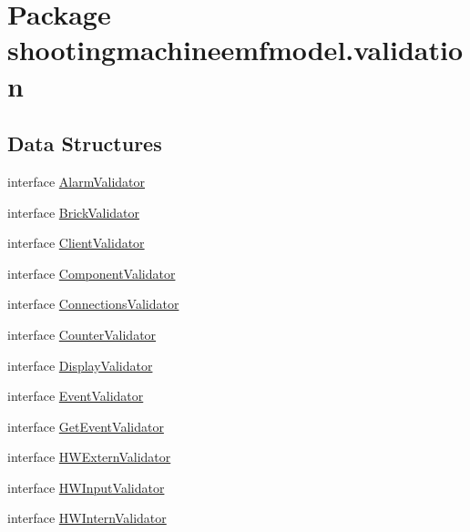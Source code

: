 \hypertarget{namespaceshootingmachineemfmodel_1_1validation}{\section{Package shootingmachineemfmodel.\-validation}
\label{namespaceshootingmachineemfmodel_1_1validation}
}
\subsection*{Data Structures}
\begin{DoxyCompactItemize}
\item 
interface \hyperlink{interfaceshootingmachineemfmodel_1_1validation_1_1_alarm_validator}{Alarm\-Validator}
\item 
interface \hyperlink{interfaceshootingmachineemfmodel_1_1validation_1_1_brick_validator}{Brick\-Validator}
\item 
interface \hyperlink{interfaceshootingmachineemfmodel_1_1validation_1_1_client_validator}{Client\-Validator}
\item 
interface \hyperlink{interfaceshootingmachineemfmodel_1_1validation_1_1_component_validator}{Component\-Validator}
\item 
interface \hyperlink{interfaceshootingmachineemfmodel_1_1validation_1_1_connections_validator}{Connections\-Validator}
\item 
interface \hyperlink{interfaceshootingmachineemfmodel_1_1validation_1_1_counter_validator}{Counter\-Validator}
\item 
interface \hyperlink{interfaceshootingmachineemfmodel_1_1validation_1_1_display_validator}{Display\-Validator}
\item 
interface \hyperlink{interfaceshootingmachineemfmodel_1_1validation_1_1_event_validator}{Event\-Validator}
\item 
interface \hyperlink{interfaceshootingmachineemfmodel_1_1validation_1_1_get_event_validator}{Get\-Event\-Validator}
\item 
interface \hyperlink{interfaceshootingmachineemfmodel_1_1validation_1_1_h_w_extern_validator}{H\-W\-Extern\-Validator}
\item 
interface \hyperlink{interfaceshootingmachineemfmodel_1_1validation_1_1_h_w_input_validator}{H\-W\-Input\-Validator}
\item 
interface \hyperlink{interfaceshootingmachineemfmodel_1_1validation_1_1_h_w_intern_validator}{H\-W\-Intern\-Validator}
\item 

\end{DoxyCompactItemize}
